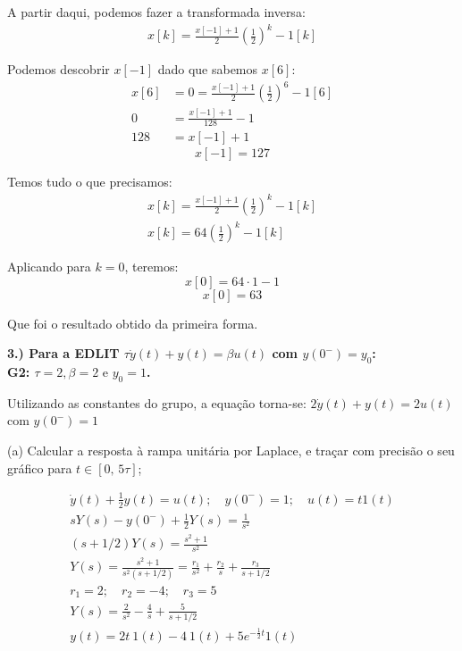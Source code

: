 \documentclass[10pt]{article}
\begin{document}
A partir daqui, podemos fazer a transformada inversa:
\begin{align*}
    x[k] = \frac{x[-1] + 1}{2} \left(\frac{1}{2}\right)^{k} - 1[k]
\end{align*}

Podemos descobrir $x[-1]$ dado que sabemos $x[6]$:
\begin{align*}
    x[6] &= 0 = \frac{x[-1] + 1}{2} \left(\frac{1}{2}\right)^{6} - 1[6]\\
    0 &= \frac{x[-1] + 1}{128} - 1\\
    128 &= x[-1] + 1
\end{align*}
\[\boxed{x[-1] = 127}\]

Temos tudo o que precisamos:
\begin{align*}
    x[k] = \frac{x[-1] + 1}{2} \left(\frac{1}{2}\right)^{k} - 1[k]\\
    x[k] = 64 \left(\frac{1}{2}\right)^k - 1[k]
\end{align*}

Aplicando para $k = 0$, teremos:
\[x[0] = 64 \cdot 1 - 1\]
\[\boxed{x[0] = 63}\]

Que foi o resultado obtido da primeira forma.

\vspace{\baselineskip}

\textbf{3.) Para a EDLIT $\tau \dot{y}(t) + y(t) = \beta u(t)$ com $y(0^-) = y_0$:\\
\textbf{G2: } $\tau = 2, \beta = 2 \text{ e } y_0 = 1$.}

Utilizando as constantes do grupo, a equação torna-se: $2 \dot{y}(t) + y(t) = 2 u(t)$ com $y(0^-) = 1$

(a) Calcular a resposta à rampa unitária por Laplace, e traçar com precisão o seu gráfico para $t \in [0,\,5\tau]$;

\begin{align*}
    \dot{y}(t) + \frac{1}{2} y(t) = u(t); \quad y(0^-) = 1; \quad u(t) = t1(t) \\
    sY(s) - y(0^-) + \frac{1}{2} Y(s) = \frac{1}{s^2} \\
    (s + 1/2)Y(s) = \frac{s^2 + 1}{s^2} \\
    Y(s) = \frac{s^2 + 1}{s^2(s + 1/2)} = \frac{r_1}{s^2} + \frac{r_2}{s} + \frac{r_3}{s + 1/2} \\
    r_1 = 2; \quad r_2 = -4; \quad r_3 = 5 \\
    Y(s) = \frac{2}{s^2} - \frac{4}{s} + \frac{5}{s + 1/2} \\
    y(t) = 2t \ 1(t) - 4 \ 1(t) + 5e^{-\frac{1}{2} t} 1(t)
\end{align*}
\end{document}
